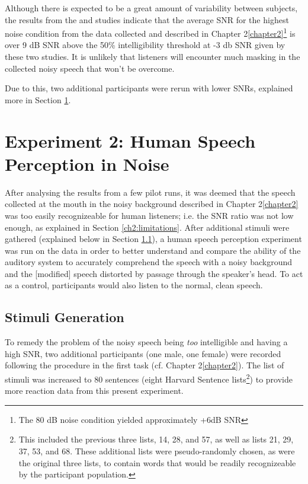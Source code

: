 \documentclass[dissertation,copyright]{uathesis}
\begin{document}
Although there is expected to be a great amount of variability between subjects, the results from the \cite{ding:13} and \cite{gilbert:13} studies indicate that the average SNR for the highest noise condition from the data collected and described in Chapter 2\ref{chapter2}\footnote{The 80 dB noise condition yielded approximately +6dB SNR} is over 9 dB SNR above the 50\% intelligibility threshold at -3 db SNR given by these two studies.  It is unlikely that listeners will encounter much masking in the collected noisy speech that won't be overcome.

Due to this, two additional participants were rerun with lower SNRs, explained more in Section \ref{expt2}.




\section{Experiment 2: Human Speech Perception in Noise}
\label{expt2}

After analysing the results from a few pilot runs, it was deemed that the speech collected at the mouth in the noisy background described in Chapter 2\ref{chapter2} was too easily recognizeable for human listeners; i.e. the SNR ratio was not low enough, as explained in Section \ref{ch2:limitations}.  After additional stimuli were gathered (explained below in Section \ref{chap4:methods:stimuli}), a human speech perception experiment was run on the data in order to better understand and compare the ability of the auditory system to accurately comprehend the speech with a noisy background and the [modified] speech distorted by passage through the speaker's head.  To act as a control, participants would also listen to the normal, clean speech.

\subsection{Stimuli Generation}
\label{chap4:methods:stimuli}

To remedy the problem of the noisy speech being \textit{too} intelligible and having a high SNR, two additional participants (one male, one female) were recorded following the procedure in the first task (cf. Chapter 2\ref{chapter2}).  The list of stimuli was increased to 80 sentences (eight Harvard Sentence lists\footnote{This included the previous three lists, 14, 28, and 57, as well as lists 21, 29, 37, 53, and 68. These additional lists were pseudo-randomly chosen, as were the original three lists, to contain words that would be readily recognizeable by the participant population.}) to provide more reaction data from this present experiment.  
\end{document}
